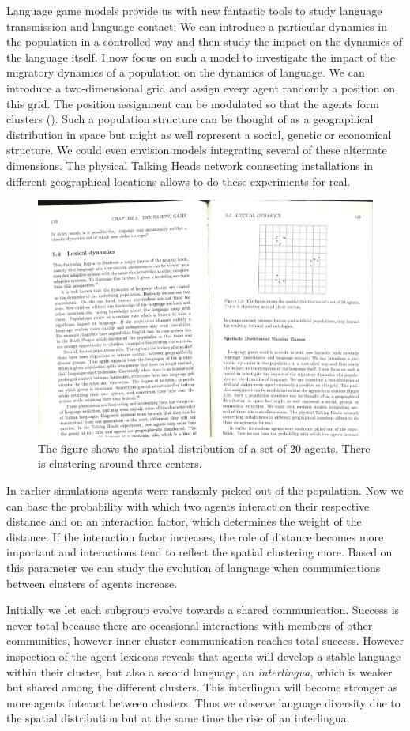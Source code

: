 Language game models provide us with new fantastic tools to study
language transmission and language contact: 
We can introduce a particular dynamics in the population
in a controlled way and then study the impact on the dynamics of the 
language itself. 
I now focus on such a model to investigate the impact of 
the migratory dynamics of a population on the dynamics 
of language. We can introduce a two-dimensional 
grid and assign every agent randomly
a position on this grid. The position assignment
can be modulated so that the agents form clusters
(). Such 
a population structure can be thought of as a 
geographical distribution in space but might as well 
represent a social, genetic or economical structure.
We could even envision models integrating
several of these alternate dimensions. The physical 
Talking Heads network connecting installations in 
different geographical locations allows to do these 
experiments for real. 
\begin{figure}[htbp]
  \centerline{\includegraphics[width=.40
\textwidth]{chap5/figs/fig-agent-distribution}}
\caption{\footnotesize The figure shows the spatial distribution of a set
of 20 agents. There is clustering around three centers.}
\label{figure-agent-distribution}
\end{figure}

In earlier simulations agents were randomly picked
out of the population. 
Now we can base the probability with which two agents interact
on their respective distance and on an
interaction factor, which determines the weight
of the distance. If the interaction factor increases, the
role of distance becomes more important and interactions tend to
reflect the spatial clustering more. Based on this
parameter we can study the evolution of
language when communications between clusters of agents 
increase. 

Initially we let each subgroup evolve towards a shared 
communication. 
Success is never total because there are occasional interactions
with members of other communities, however inner-cluster
communication reaches total success.
However inspection of the agent lexicons reveals that
agents will develop a stable
language within their cluster, but also a
second language, an {\it interlingua}, which is weaker but
shared among the different clusters. This interlingua will
become stronger as more agents interact between clusters.
Thus we observe language diversity due to
the spatial distribution but at the same time the rise 
of an interlingua.

